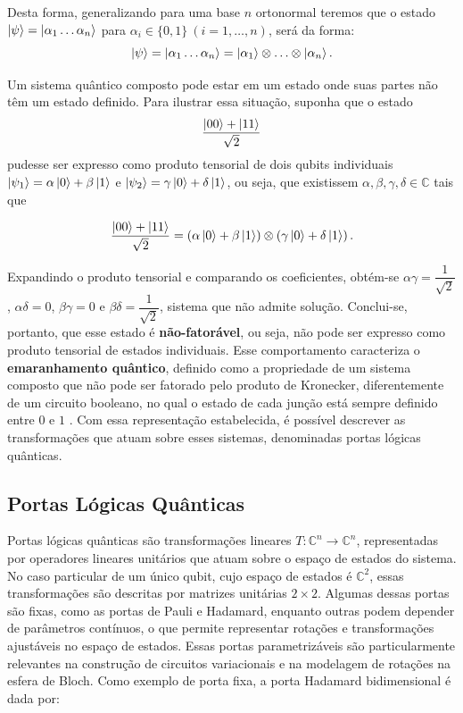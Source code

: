 Desta forma, generalizando para uma base $n$ ortonormal teremos que o estado $\ket{\psi}=\ket{\alpha_1\dots\alpha_n}$ para $\alpha_i\in \{0,1\}\ (i=1,\hdots,n)$, será da forma:
$$
    \ket{\psi}=\ket{\alpha_1\hdots\alpha_n}=\ket{\alpha_1}\otimes\hdots\otimes\ket{\alpha_n}.
$$

Um sistema quântico composto pode estar em um estado onde suas partes não têm um estado definido. Para ilustrar essa situação, suponha que o estado
$$\dfrac{\ket{00}+\ket{11}}{\sqrt{2}}$$
pudesse ser expresso como produto tensorial de dois qubits individuais $\ket{\psi_1}=\alpha\ket{0}+\beta\ket{1}$ e $\ket{\psi_2}=\gamma\ket{0}+\delta\ket{1}$, ou seja, que existissem $\alpha, \beta, \gamma, \delta \in \mathbb{C}$ tais que

\begin{equation}
    \label{eq:estado_bell}
    \dfrac{\ket{00}+\ket{11}}{\sqrt{2}} = \left(\alpha\ket{0}+\beta\ket{1}\right)\otimes\left(\gamma\ket{0}+\delta\ket{1}\right).
\end{equation}

\noindent Expandindo o produto tensorial e comparando os coeficientes, obtém-se $\alpha\gamma = \dfrac{1}{\sqrt{2}}$, $\alpha\delta=0$, $\beta\gamma=0$ e $\beta\delta=\dfrac{1}{\sqrt{2}}$, sistema que não admite solução. Conclui-se, portanto, que esse estado é \textbf{não-fatorável}, ou seja, não pode ser expresso como produto tensorial de estados individuais. Esse comportamento caracteriza o \textbf{emaranhamento quântico}, definido como a propriedade de um sistema composto que não pode ser fatorado pelo produto de Kronecker, diferentemente de um circuito booleano, no qual o estado de cada junção está sempre definido entre $0$ e $1$ \cite{Marquezino2019, lipton_quantum_2014}. Com essa representação estabelecida, é possível descrever as transformações que atuam sobre esses sistemas, denominadas portas lógicas quânticas.

\subsection{Portas Lógicas Quânticas}
Portas lógicas quânticas são transformações lineares $T:\mathbb{C}^n \rightarrow \mathbb{C}^n$, representadas por operadores lineares unitários que atuam sobre o espaço de estados do sistema. No caso particular de um único qubit, cujo espaço de estados é $\mathbb{C}^2$, essas transformações são descritas por matrizes unitárias $2\times 2$. Algumas dessas portas são fixas, como as portas de Pauli e Hadamard, enquanto outras podem depender de parâmetros contínuos, o que permite representar rotações e transformações ajustáveis no espaço de estados. Essas portas parametrizáveis são particularmente relevantes na construção de circuitos variacionais e na modelagem de rotações na esfera de Bloch. Como exemplo de porta fixa, a porta Hadamard bidimensional é dada por:

